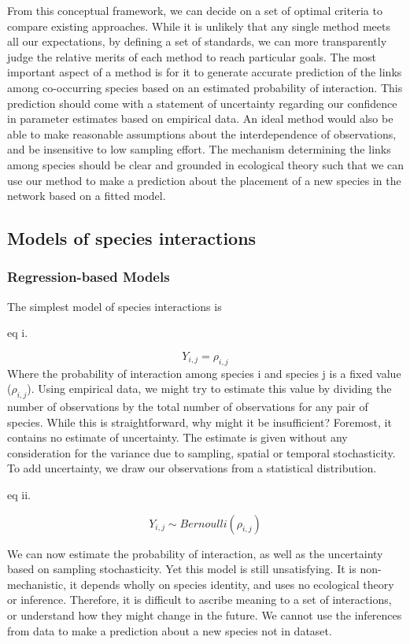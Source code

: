From this conceptual framework, we can decide on a set of optimal criteria to
compare existing approaches. While it is unlikely that any single method meets all
our expectations, by defining a set of standards, we can more transparently
judge the relative merits of each method to reach particular goals. The most
important aspect of a method is for it to generate accurate prediction of the
links among co-occurring species based on an estimated probability of
interaction. This prediction should come with a statement of uncertainty
regarding our confidence in parameter estimates based on empirical data. An
ideal method would also be able to make reasonable assumptions about the interdependence of
observations, and be insensitive to low sampling effort. The
mechanism determining the links among species should be clear and grounded
in ecological theory such that we can use our method to make a prediction
about the placement of a new species in the network based on a fitted model.

\subsection{Models of species
interactions}\label{models-of-species-interactions}

\subsubsection{Regression-based Models}\label{regression-based-models}

The simplest model of species interactions is

eq i.

\[Y_{i,j} = \rho_{i,j}\] Where the probability of interaction among species i
and species j is a fixed value (\(\rho_{i,j}\)). Using empirical data, we might
try to estimate this value by dividing the number of observations by the total
number of observations for any pair of species. While this is straightforward,
why might it be insufficient? Foremost, it contains no estimate of uncertainty.
The estimate is given without any consideration for the variance due to
sampling, spatial or temporal stochasticity. To add uncertainty, we draw our
observations from a statistical distribution.

eq ii.

\[ Y_{i,j} \sim Bernoulli(\rho_{i,j}) \]

We can now estimate the probability of interaction, as well as the uncertainty
based on sampling stochasticity. Yet this model is still unsatisfying. It is
non-mechanistic, it depends wholly on species identity, and uses no ecological
theory or inference. Therefore, it is difficult to ascribe meaning to a set of
interactions, or understand how they might change in the future. We cannot use
the inferences from data to make a prediction about a new species not in
dataset.

